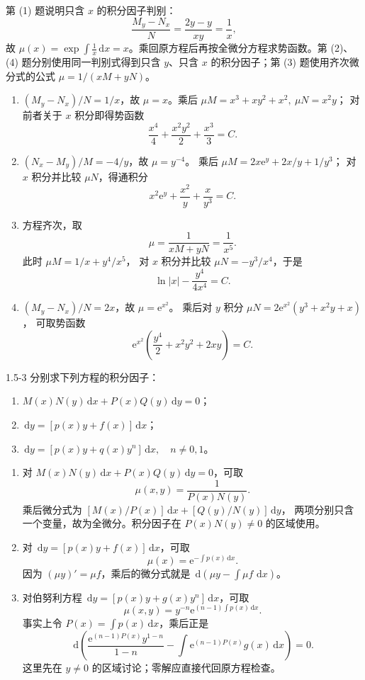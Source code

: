 \documentclass[UTF8,a4paper,11pt]{ctexart}
\newcommand{\dd}{\,\mathrm d}
\newcommand{\e}{\mathrm e}
\begin{document}
\begin{solution}
第 (1) 题说明只含 $x$ 的积分因子判别：
\[
\frac{M_y-N_x}{N}=\frac{2y-y}{xy}=\frac1x,
\]
故 $\mu(x)=\exp\int\frac1x\dd x=x$。乘回原方程后再按全微分方程求势函数。第 (2)、(4) 题分别使用同一判别式得到只含 $y$、只含 $x$ 的积分因子；第 (3) 题使用齐次微分式的公式 $\mu=1/(xM+yN)$。
\begin{enumerate}[label=(\arabic*)]
\item $(M_y-N_x)/N=1/x$，故 $\mu=x$。乘后
$\mu M=x^3+xy^2+x^2,\ \mu N=x^2y$；
对前者关于 $x$ 积分即得势函数
\[
\boxed{\frac{x^4}{4}+\frac{x^2y^2}{2}+\frac{x^3}{3}=C}.
\]
\item $(N_x-M_y)/M=-4/y$，故 $\mu=y^{-4}$。
乘后 $\mu M=2x\e^y+2x/y+1/y^3$；
对 $x$ 积分并比较 $\mu N$，得通积分
\[
\boxed{x^2\e^y+\frac{x^2}{y}+\frac{x}{y^3}=C}.
\]
\item 方程齐次，取
\[
\mu=\frac1{xM+yN}=\frac1{x^5}.
\]
此时 $\mu M=1/x+y^4/x^5$，
对 $x$ 积分并比较 $\mu N=-y^3/x^4$，于是
\[
\boxed{\ln|x|-\frac{y^4}{4x^4}=C}.
\]
\item $(M_y-N_x)/N=2x$，故 $\mu=\e^{x^2}$。
乘后对 $y$ 积分 $\mu N=2\e^{x^2}(y^3+x^2y+x)$，
可取势函数
\[
\boxed{\e^{x^2}\left(\frac{y^4}{2}+x^2y^2+2xy\right)=C}.
\]
\end{enumerate}
\end{solution}

\begin{problem}{1.5-3}
分别求下列方程的积分因子：
  \begin{enumerate}[label=(\arabic*)]
    \item $\displaystyle M(x)N(y)\dd x+P(x)Q(y)\dd y=0$；
    \item $\displaystyle \dd y=[p(x)y+f(x)]\dd x$；
    \item $\displaystyle \dd y=[p(x)y+q(x)y^n]\dd x,\quad n\ne0,1$。
  \end{enumerate}
\end{problem}

\begin{solution}
\begin{enumerate}[label=(\arabic*)]
\item 对 $M(x)N(y)\dd x+P(x)Q(y)\dd y=0$，可取
\[
\boxed{\mu(x,y)=\frac1{P(x)N(y)}}.
\]
乘后微分式为
$[M(x)/P(x)]\dd x+[Q(y)/N(y)]\dd y$，
两项分别只含一个变量，故为全微分。积分因子在 $P(x)N(y)\ne0$ 的区域使用。
\item 对 $\dd y=[p(x)y+f(x)]\dd x$，可取
\[
\boxed{\mu(x)=\e^{-\int p(x)\dd x}}.
\]
因为 $(\mu y)'=\mu f$，乘后的微分式就是
$\dd(\mu y-\int\mu f\,\dd x)$。
\item 对伯努利方程 $\dd y=[p(x)y+g(x)y^n]\dd x$，可取
\[
\boxed{\mu(x,y)=y^{-n}\e^{(n-1)\int p(x)\dd x}}.
\]
事实上令 $P(x)=\int p(x)\dd x$，乘后正是
\[
\dd\left(\frac{\e^{(n-1)P(x)}y^{1-n}}{1-n}
 -\int \e^{(n-1)P(x)}g(x)\dd x\right)=0.
\]
这里先在 $y\ne0$ 的区域讨论；零解应直接代回原方程检查。
\end{enumerate}
\end{solution}
\end{document}
